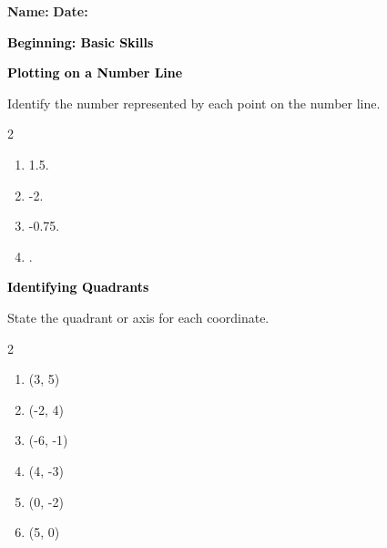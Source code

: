 \documentclass[12pt, letterpaper, fleqn]{article}
\newcommand{\blank}{\underline{\hspace{2.2cm}}}
\begin{document}
\textbf{Name:} \underline{\hspace{5cm}}
\hfill
\textbf{Date:} \underline{\hspace{3cm}}\\

\begin{tcolorbox}[colback=customteal!20]
    \large\textcolor{black}{\textbf{Beginning: Basic Skills}}
\end{tcolorbox}

\vspace{3mm}

\begin{tcolorbox}[colback=customteal!20]
\large\textcolor{black}{\textbf{Plotting on a Number Line}}
\end{tcolorbox}

\noindent
Identify the number represented by each point on the number line.

\vspace{3mm}
\begin{multicols}{2}
\begin{enumerate}[itemsep=1cm, leftmargin=0.6cm]
\item {} 1.5.  \blank
\item {} -2.  \blank
\item {} -0.75.  \blank
\item {} .  \blank
\end{enumerate}
\end{multicols}
\newpage

\begin{tcolorbox}[colback=customteal!20]
\large\textcolor{black}{\textbf{Identifying Quadrants}}
\end{tcolorbox}

\noindent
State the quadrant or axis for each coordinate.

\vspace{3mm}
\begin{multicols}{2}
\begin{enumerate}[itemsep=1cm, leftmargin=0.6cm]
\item (3, 5) \quad \rightarrow \quad \blank
\item (-2, 4) \quad \rightarrow \quad \blank
\item (-6, -1) \quad \rightarrow \quad \blank
\item (4, -3) \quad \rightarrow \quad \blank
\item (0, -2) \quad \rightarrow \quad \blank
\item (5, 0) \quad \rightarrow \quad \blank
\end{enumerate}
\end{multicols}
\newpage
\end{document}
